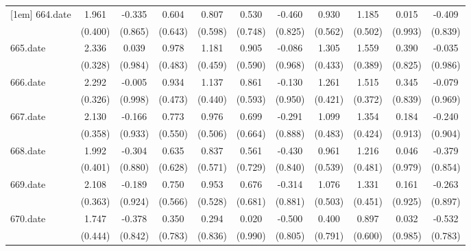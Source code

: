 \begin{tabular}{l*{10}{c}}
[1em]
664.date    &       1.961&      -0.335&       0.604&       0.807&       0.530&      -0.460&       0.930&       1.185&       0.015&      -0.409\\
            &     (0.400)&     (0.865)&     (0.643)&     (0.598)&     (0.748)&     (0.825)&     (0.562)&     (0.502)&     (0.993)&     (0.839)\\
[1em]
665.date    &       2.336&       0.039&       0.978&       1.181&       0.905&      -0.086&       1.305&       1.559&       0.390&      -0.035\\
            &     (0.328)&     (0.984)&     (0.483)&     (0.459)&     (0.590)&     (0.968)&     (0.433)&     (0.389)&     (0.825)&     (0.986)\\
[1em]
666.date    &       2.292&      -0.005&       0.934&       1.137&       0.861&      -0.130&       1.261&       1.515&       0.345&      -0.079\\
            &     (0.326)&     (0.998)&     (0.473)&     (0.440)&     (0.593)&     (0.950)&     (0.421)&     (0.372)&     (0.839)&     (0.969)\\
[1em]
667.date    &       2.130&      -0.166&       0.773&       0.976&       0.699&      -0.291&       1.099&       1.354&       0.184&      -0.240\\
            &     (0.358)&     (0.933)&     (0.550)&     (0.506)&     (0.664)&     (0.888)&     (0.483)&     (0.424)&     (0.913)&     (0.904)\\
[1em]
668.date    &       1.992&      -0.304&       0.635&       0.837&       0.561&      -0.430&       0.961&       1.216&       0.046&      -0.379\\
            &     (0.401)&     (0.880)&     (0.628)&     (0.571)&     (0.729)&     (0.840)&     (0.539)&     (0.481)&     (0.979)&     (0.854)\\
[1em]
669.date    &       2.108&      -0.189&       0.750&       0.953&       0.676&      -0.314&       1.076&       1.331&       0.161&      -0.263\\
            &     (0.363)&     (0.924)&     (0.566)&     (0.528)&     (0.681)&     (0.881)&     (0.503)&     (0.451)&     (0.925)&     (0.897)\\
[1em]
670.date    &       1.747&      -0.378&       0.350&       0.294&       0.020&      -0.500&       0.400&       0.897&       0.032&      -0.532\\
            &     (0.444)&     (0.842)&     (0.783)&     (0.836)&     (0.990)&     (0.805)&     (0.791)&     (0.600)&     (0.985)&     (0.783)\\

\end{tabular}
